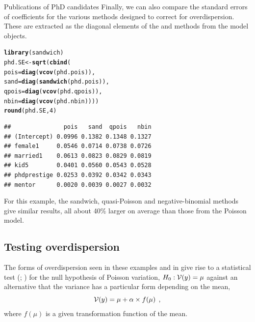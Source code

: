 \documentclass[11pt]{book}\usepackage[]{graphicx}\usepackage[]{color}
\makeatletter
\newcommand{\hlnum}[1]{\textcolor[rgb]{0.686,0.059,0.569}{#1}}%
\newcommand{\hlstd}[1]{\textcolor[rgb]{0.345,0.345,0.345}{#1}}%
\newcommand{\hlkwb}[1]{\textcolor[rgb]{0.69,0.353,0.396}{#1}}%
\newcommand{\hlkwc}[1]{\textcolor[rgb]{0.333,0.667,0.333}{#1}}%
\newcommand{\hlkwd}[1]{\textcolor[rgb]{0.737,0.353,0.396}{\textbf{#1}}}%
\newenvironment{kframe}{%
 \def\at@end@of@kframe{}%
 \ifinner\ifhmode%
  \def\at@end@of@kframe{\end{minipage}}%
  \begin{minipage}{\columnwidth}%
 \fi\fi%
 \def\FrameCommand##1{\hskip\@totalleftmargin \hskip-\fboxsep
 \colorbox{shadecolor}{##1}\hskip-\fboxsep
     \hskip-\linewidth \hskip-\@totalleftmargin \hskip\columnwidth}%
 \MakeFramed {\advance\hsize-\width
   \@totalleftmargin\z@ \linewidth\hsize
   \@setminipage}}%
 {\par\unskip\endMakeFramed%
 \at@end@of@kframe}
\newenvironment{knitrout}{}{} %
\renewenvironment{knitrout}{\small\renewcommand{\baselinestretch}{.85}}{} %
\makeatother
\begin{document}
\begin{Example}[phdpubs3]{Publications of PhD candidates}
Finally, we can also compare the standard errors of coefficients
for the various methods designed to correct for overdispersion.  These are extracted 
as the diagonal elements of the  and  methods from the model objects.
\begin{knitrout}
\color{fgcolor}\begin{kframe}
\begin{alltt}
\hlkwd{library}\hlstd{(sandwich)}
\hlstd{phd.SE} \hlkwb{<-} \hlkwd{sqrt}\hlstd{(}\hlkwd{cbind}\hlstd{(}
  \hlkwc{pois}\hlstd{=}\hlkwd{diag}\hlstd{(}\hlkwd{vcov}\hlstd{(phd.pois)),}
  \hlkwc{sand}\hlstd{=}\hlkwd{diag}\hlstd{(}\hlkwd{sandwich}\hlstd{(phd.pois)),}
  \hlkwc{qpois}\hlstd{=}\hlkwd{diag}\hlstd{(}\hlkwd{vcov}\hlstd{(phd.qpois)),}
  \hlkwc{nbin}\hlstd{=}\hlkwd{diag}\hlstd{(}\hlkwd{vcov}\hlstd{(phd.nbin))))}
\hlkwd{round}\hlstd{(phd.SE,}\hlnum{4}\hlstd{)}
\end{alltt}
\begin{verbatim}
##               pois   sand  qpois   nbin
## (Intercept) 0.0996 0.1382 0.1348 0.1327
## female1     0.0546 0.0714 0.0738 0.0726
## married1    0.0613 0.0823 0.0829 0.0819
## kid5        0.0401 0.0560 0.0543 0.0528
## phdprestige 0.0253 0.0392 0.0342 0.0343
## mentor      0.0020 0.0039 0.0027 0.0032
\end{verbatim}
\end{kframe}
\end{knitrout}
For this example, the sandwich, quasi-Poisson and negative-binomial methods give similar results,
all about 40\% larger on average than those from the Poisson model.  
\end{Example}

\subsection{Testing overdispersion}\label{sec:glm-disptest}

The forms of overdispersion seen in these examples and in 
give rise to a statistical test 
(\citealt{CameronTrivedi:1990}; \citealt[\S 3.4]{CameronTrivedi:1998})
for the 
null hypothesis of Poisson variation, $H_0 : \mathcal{V}(y) = \mu$ against an alternative that the variance
has a particular form depending on the mean,
\begin{equation*}
\mathcal{V}(y) = \mu + \alpha \times f(\mu) \:\: ,
\end{equation*}
where $f(\mu)$ is a given transformation function of the mean.
\end{document}
